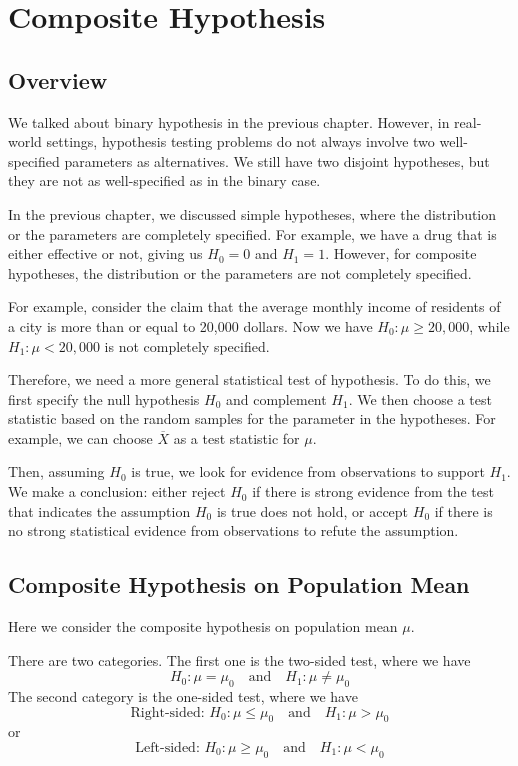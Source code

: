 \chapter{Composite Hypothesis}

\section{Overview}
We talked about binary hypothesis in the previous chapter. However, in real-world settings, hypothesis testing problems do not always involve two well-specified parameters as alternatives. We still have two disjoint hypotheses, but they are not as well-specified as in the binary case.

In the previous chapter, we discussed simple hypotheses, where the distribution or the parameters are completely specified. For example, we have a drug that is either effective or not, giving us \(H_0 = 0\) and \(H_1 = 1\). However, for composite hypotheses, the distribution or the parameters are not completely specified.

For example, consider the claim that the average monthly income of residents of a city is more than or equal to 20,000 dollars. Now we have \(H_0: \mu \geq 20,000\), while \(H_1: \mu < 20,000\) is not completely specified.

Therefore, we need a more general statistical test of hypothesis. To do this, we first specify the null hypothesis \(H_0\) and complement \(H_1\). We then choose a test statistic based on the random samples for the parameter in the hypotheses. For example, we can choose \(\overline{X}\) as a test statistic for \(\mu\). 

Then, assuming \(H_0\) is true, we look for evidence from observations to support \(H_1\). We make a conclusion: either reject \(H_0\) if there is strong evidence from the test that indicates the assumption \(H_0\) is true does not hold, or accept \(H_0\) if there is no strong statistical evidence from observations to refute the assumption.

\section{Composite Hypothesis on Population Mean}
Here we consider the composite hypothesis on population mean \(\mu\).

There are two categories. The first one is the two-sided test, where we have
\[
  H_0: \mu = \mu_0 \quad \text{and} \quad H_1: \mu \neq \mu_0
\]
The second category is the one-sided test, where we have 
\[
  \text{Right-sided: } H_0: \mu \leq \mu_0 \quad \text{and} \quad H_1: \mu > \mu_0
\]
or
\[
  \text{Left-sided: } H_0: \mu \geq \mu_0 \quad \text{and} \quad H_1: \mu < \mu_0
\]

